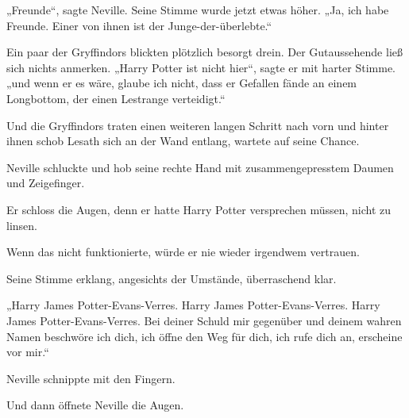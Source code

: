 „Freunde“, sagte Neville. Seine Stimme wurde jetzt etwas höher. „Ja, ich habe Freunde. Einer von ihnen ist der Junge-der-überlebte.“

Ein paar der Gryffindors blickten plötzlich besorgt drein. Der Gutaussehende ließ sich nichts anmerken. „Harry Potter ist nicht hier“, sagte er mit harter Stimme. „und wenn er es wäre, glaube ich nicht, dass er Gefallen fände an einem Longbottom, der einen Lestrange verteidigt.“

Und die Gryffindors traten einen weiteren langen Schritt nach vorn und hinter ihnen schob Lesath sich an der Wand entlang, wartete auf seine Chance.

Neville schluckte und hob seine rechte Hand mit zusammengepresstem Daumen und Zeigefinger.

Er schloss die Augen, denn er hatte Harry Potter versprechen müssen, nicht zu linsen.

Wenn das nicht funktionierte, würde er nie wieder irgendwem vertrauen.

Seine Stimme erklang, angesichts der Umstände, überraschend klar.

„Harry James Potter-Evans-Verres. Harry James Potter-Evans-Verres. Harry James Potter-Evans-Verres. Bei deiner Schuld mir gegenüber und deinem wahren Namen beschwöre ich dich, ich öffne den Weg für dich, ich rufe dich an, erscheine vor mir.“

Neville schnippte mit den Fingern.

Und dann öffnete Neville die Augen.

